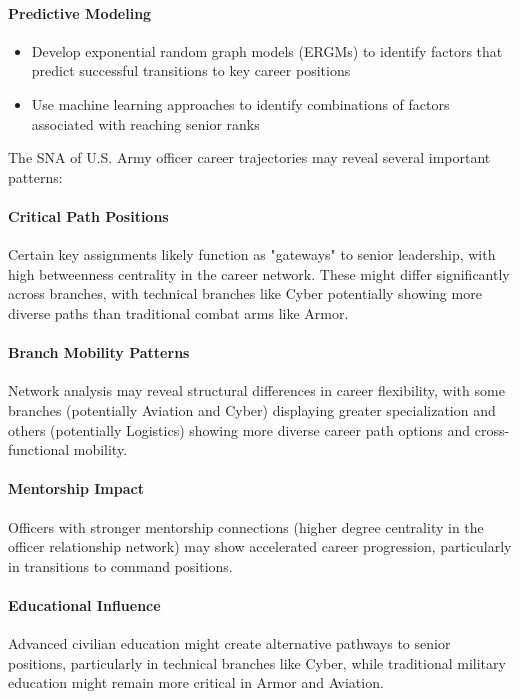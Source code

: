 \documentclass[../main.tex]{subfiles}
\begin{document}
\paragraph{Predictive Modeling}
\begin{itemize}
\item Develop exponential random graph models (ERGMs) to identify factors that predict successful transitions to key career positions
\item Use machine learning approaches to identify combinations of factors associated with reaching senior ranks
\end{itemize}


The SNA of U.S. Army officer career trajectories may reveal several important patterns:

\paragraph{Critical Path Positions} Certain key assignments likely function as "gateways" to senior leadership, with high betweenness centrality in the career network. These might differ significantly across branches, with technical branches like Cyber potentially showing more diverse paths than traditional combat arms like Armor.

\paragraph{Branch Mobility Patterns} Network analysis may reveal structural differences in career flexibility, with some branches (potentially Aviation and Cyber) displaying greater specialization and others (potentially Logistics) showing more diverse career path options and cross-functional mobility.

\paragraph{Mentorship Impact} Officers with stronger mentorship connections (higher degree centrality in the officer relationship network) may show accelerated career progression, particularly in transitions to command positions.

\paragraph{Educational Influence} Advanced civilian education might create alternative pathways to senior positions, particularly in technical branches like Cyber, while traditional military education might remain more critical in Armor and Aviation.
\end{document}
